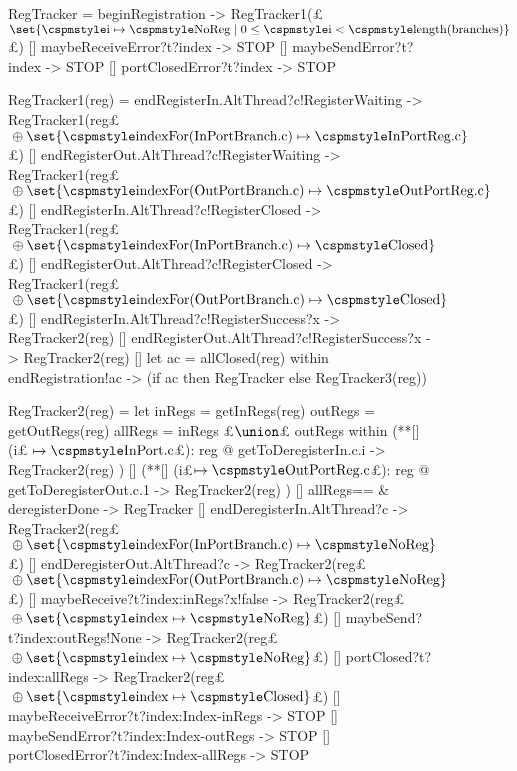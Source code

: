 \begin{figure}
\begin{cspm}
RegTracker = 
  beginRegistration -> RegTracker1(£%
    $\set{\CSPMMR{i} \mapsto \CSPMMR{NoReg} \mid 
       0 \le \CSPMMR{i} < \CSPMMR{length(branches})}$£) 
  [] maybeReceiveError?t?index -> STOP
  [] maybeSendError?t?index -> STOP
  [] portClosedError?t?index -> STOP
  
RegTracker1(reg) = 
  endRegisterIn.AltThread?c!RegisterWaiting -> 
    RegTracker1(reg£%
      $\null\oplus \set{\CSPMMR{indexFor(InPortBranch.c)} \mapsto 
         \CSPMMR{InPortReg.c}}$£)
  [] endRegisterOut.AltThread?c!RegisterWaiting -> 
       RegTracker1(reg£%
      $\null\oplus \set{\CSPMMR{indexFor(OutPortBranch.c)} \mapsto 
         \CSPMMR{OutPortReg.c}}$£)
  [] endRegisterIn.AltThread?c!RegisterClosed -> 
       RegTracker1(reg£%
      $\null\oplus \set{\CSPMMR{indexFor(InPortBranch.c)} \mapsto 
         \CSPMMR{Closed}}$£) 
  [] endRegisterOut.AltThread?c!RegisterClosed -> 
       RegTracker1(reg£%
      $\null\oplus \set{\CSPMMR{indexFor(OutPortBranch.c)} \mapsto 
         \CSPMMR{Closed}}$£)
  [] endRegisterIn.AltThread?c!RegisterSuccess?x -> RegTracker2(reg)
  [] endRegisterOut.AltThread?c!RegisterSuccess?x -> RegTracker2(reg)
  [] let ac = allClosed(reg) within endRegistration!ac -> (if ac then RegTracker else RegTracker3(reg))

RegTracker2(reg) = 
  let inRegs = getInRegs(reg) 
      outRegs = getOutRegs(reg)
      allRegs = inRegs £$\union$£ outRegs within
  (**[] (i£$\null \mapsto \CSPMMR{InPort.c}$£): reg @ getToDeregisterIn.c.i -> RegTracker2(reg) )
  [] (**[] (i£$\mapsto \CSPMMR{OutPortReg.c}$£): reg @ getToDeregisterOut.c.1 -> RegTracker2(reg) )
  [] allRegs=={} & deregisterDone -> RegTracker
  [] endDeregisterIn.AltThread?c -> RegTracker2(reg£%
      $\null\oplus \set{\CSPMMR{indexFor(InPortBranch.c)} \mapsto 
         \CSPMMR{NoReg}}$£)
  [] endDeregisterOut.AltThread?c -> RegTracker2(reg£%
      $\null\oplus \set{\CSPMMR{indexFor(OutPortBranch.c)} \mapsto 
         \CSPMMR{NoReg}}$£)
  [] maybeReceive?t?index:inRegs?x!false -> RegTracker2(reg£%
   $\null\oplus \set{\CSPMMR{index} \mapsto \CSPMMR{NoReg}}$£) 
  [] maybeSend?t?index:outRegs!None -> RegTracker2(reg£%
    $\null\oplus \set{\CSPMMR{index} \mapsto \CSPMMR{NoReg}}$£)
  [] portClosed?t?index:allRegs -> RegTracker2(reg£%
    $\null\oplus \set{\CSPMMR{index} \mapsto \CSPMMR{Closed}}$£)
  [] maybeReceiveError?t?index:Index-inRegs -> STOP
  [] maybeSendError?t?index:Index-outRegs -> STOP
  [] portClosedError?t?index:Index-allRegs -> STOP


\end{cspm}
\end{figure}
